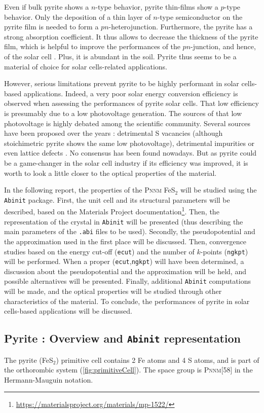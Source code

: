 \documentclass[11pt,a4paper]{article}
\begin{document}
Even if bulk pyrite shows a $n$-type behavior, pyrite thin-films show a $p$-type behavior. Only the deposition of a thin layer of $n$-type semiconductor on the pyrite film is needed to form a $pn$-heterojunction. Furthermore, the pyrite has a strong absorption coefficient. It thus allows to decrease the thickness of the pyrite film, which is helpful to improve the performances of the $pn$-junction, and hence, of the solar cell \cite{thinFilms}. Plus, it is abundant in the soil. Pyrite thus seems to be a material of choice for solar cells-related applications.

However, serious limitations prevent pyrite to be highly performant in solar cells-based applications. Indeed, a very poor solar energy conversion efficiency is observed when assessing the performances of pyrite solar cells. That low efficiency is presumably due to a low photovoltage generation. The sources of that low photovoltage is highly debated among the scientific community. Several sources have been proposed over the years : detrimental S vacancies (although stoichimetric pyrite shows the same low photovoltage), detrimental impurities or even lattice defects \cite{limitations}. No consensus has been found nowadays. But as pyrite could be a game-changer in the solar cell industry if its efficiency was improved, it is worth to look a little closer to the optical properties of the material.

In the following report, the properties of the \textsc{Pnnm} FeS$_2$ will be studied using the \texttt{Abinit} package. First, the unit cell and its structural parameters will be described, based on the Materials Project documentation\footnote{\url{https://materialsproject.org/materials/mp-1522/}}. Then, the representation of the crystal in \texttt{Abinit} will be presented (thus describing the main parameters of the \texttt{.abi} files to be used). Secondly, the pseudopotential and the approximation used in the first place will be discussed. Then, convergence studies based on the energy cut-off (\texttt{ecut}) and the number of $k$-points (\texttt{ngkpt}) will be performed. When a proper (\texttt{ecut},\texttt{ngkpt}) will have been determined, a discussion about the pseudopotential and the approximation will be held, and possible alternatives will be presented. Finally, additional \texttt{Abinit} computations will be made, and the optical properties will be studied through other characteristics of the material. To conclude, the performances of pyrite in solar cells-based applications will be discussed.
\subsection{Pyrite : Overview and \texttt{Abinit} representation}
The pyrite (FeS$_2$) primitive cell contains 2 Fe atoms and 4 S atoms, and is part of the orthorombic system (\autoref{fig:primitiveCell}). The space group is \textsc{Pnnm}[58] in the Hermann-Mauguin notation. 
\end{document}
